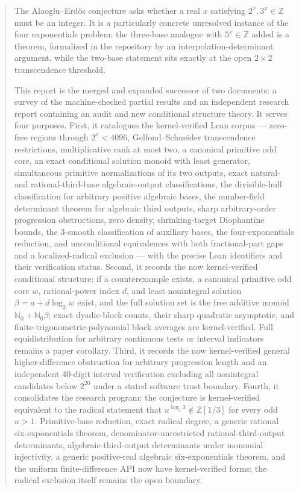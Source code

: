 \documentclass[11pt,oneside]{article}
\theoremstyle{definition}
\theoremstyle{remark}
\newcommand{\Nzero}{\mathbb N_0}
\newcommand{\Z}{\mathbb Z}
\begin{document}
\begin{abstract}
The Alaoglu--Erd\H{o}s conjecture asks whether a real $x$ satisfying $2^x,3^x\in\Z$ must be
an integer.  It is a particularly concrete unresolved instance of the four exponentials
problem: the three-base analogue with $5^x\in\Z$ added is a theorem, formalized in the
repository by an interpolation-determinant argument, while the two-base statement sits exactly
at the open $2\times2$ transcendence threshold.

This report is the merged and expanded successor of two documents: a survey of the
machine-checked partial results and an independent research report containing an audit and new
conditional structure theory.  It serves four purposes.  First, it catalogues the
kernel-verified Lean corpus --- zero-free regions through $2^x<4096$, Gelfond--Schneider
transcendence restrictions, multiplicative rank at most two, a canonical primitive odd core,
an exact conditional solution monoid with least generator, simultaneous primitive
normalizations of its two outputs, exact natural- and rational-third-base
algebraic-output classifications, the divisible-hull classification for arbitrary positive
algebraic bases, the number-field determinant theorem for algebraic third outputs,
sharp arbitrary-order
progression obstructions, zero density, shrinking-target Diophantine bounds, the $3$-smooth
classification of auxiliary bases, the four-exponentials reduction, and unconditional
equivalences with both fractional-part gaps and a localized-radical exclusion --- with the
precise Lean identifiers and their verification status.  Second, it records the now
kernel-verified conditional structure: if a counterexample exists, a canonical primitive odd
core $w$, rational-power index $d$, and least nonintegral solution
$\beta=a+d\log_2w$ exist, and the full solution set is the free additive monoid
$\Nzero+\Nzero\beta$; exact dyadic-block counts, their sharp quadratic asymptotic, and
finite-trigonometric-polynomial block averages are kernel-verified.  Full equidistribution for
arbitrary continuous tests or interval indicators remains a paper corollary.  Third, it records the now kernel-verified general higher-difference
obstruction for arbitrary progression length and an independent 40-digit interval verification excluding all
nonintegral candidates below $2^{20}$ under a stated software trust boundary.  Fourth, it
consolidates the research program: the conjecture is kernel-verified equivalent to the radical
statement that $u^{\log_2 3}\notin\Z[1/3]$ for every odd $u>1$.  Primitive-base reduction,
exact radical degree, a generic rational six-exponentials theorem, denominator-unrestricted
rational-third-output determinants, algebraic-third-output determinants under monomial
injectivity, a generic positive-real algebraic six-exponentials theorem, and the uniform finite-difference API now have
kernel-verified forms;
the radical exclusion itself remains the open boundary.
\end{abstract}
\end{document}
